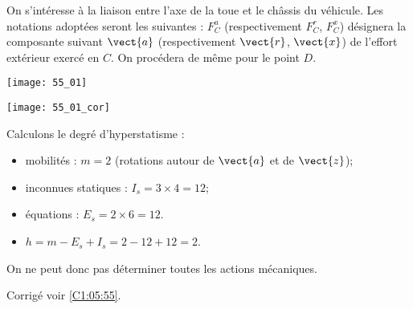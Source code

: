 \normalfalse \difficiletrue \tdifficilefalse
\correctiontrue


\setcounter{question}{0}
\ifcorrection
\else
{}
\fi

\ifprof
\else
On s'intéresse à la liaison entre l'axe de la toue et le châssis du véhicule. Les notations adoptées seront les suivantes : $F^a_{C}$ (respectivement $F^r_{C}$, $F^x_{C}$) désignera la composante suivant $\vect{a}$ (respectivement $\vect{r}$, $\vect{x}$) de l'effort extérieur exercé en $C$. On procédera de même pour le point $D$. 
\begin{center}
\texttt{[image: 55\_01]}
\end{center}


\fi

\ifprof
\begin{center}
\texttt{[image: 55\_01\_cor]}
\end{center}

\else
\fi



\ifprof
Calculons le degré d'hyperstatisme : 
\begin{itemize}
\item mobilités : $m=2$ (rotations autour de $\vect{a}$ et de $\vect{z}$);
\item inconnues statiques : $I_s = 3 \times 4 = 12$;
\item équations : $E_s = 2\times 6=12$. 
\item $h = m-E_s + I_s= 2 -12 + 12 = 2$.
\end{itemize}
On ne peut donc pas déterminer toutes les actions mécaniques. 

\else
\fi
\ifprof
\else
\begin{flushright}
\footnotesize{Corrigé  voir \ref{C1:05:55}.}
\end{flushright}%
\fi